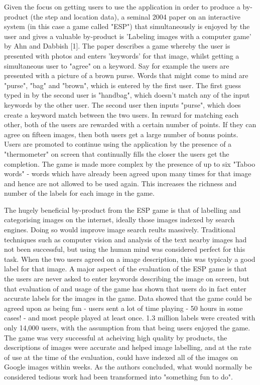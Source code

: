 \documentclass{l4proj}
\begin{document}
Given the focus on getting users to use the application in order to produce a by-product (the step and location data), a seminal 2004 paper on an interactive system (in this case a game called "ESP") that simultaneously is enjoyed by the user and gives a valuable by-product is 'Labeling images with a computer game' by Ahn and Dabbish [1]. The paper describes a game whereby the user is presented with photos and enters 'keywords' for that image, whilst getting a simultaneous user to "agree" on a keyword. Say for example the users are presented with a picture of a brown purse. Words that might come to mind are "purse", "bag" and "brown", which is entered by the first user. The first guess typed in by the second user is "handbag", which doesn't match any of the input keywords by the other user. The second user then inputs "purse", which does create a keyword match between the two users. In reward for matching each other, both of the users are rewarded with a certain number of points. If they can agree on fifteen images, then both users get a large number of bonus points. Users are promoted to continue using the application by the presence of a "thermometer" on screen that continually fills the closer the users get the completion. The game is made more complex by the presence of up to six "Taboo words" - words which have already been agreed upon many times for that image and hence are not allowed to be used again. This increases the richness and number of the labels for each image in the game.

The hugely beneficial by-product from the ESP game is that of labelling and categorising images on the internet, ideally those images indexed by search engines. Doing so would improve image search reults massively. Traditional techniques such as computer vision and analysis of the text nearby images had not been successful, but using the human mind was considered perfect for this task. When the two users agreed on a image description, this was typicaly a good label for that image. A major aspect of the evaluation of the ESP game is that the users are never asked to enter keywords describing the image on screen, but that evaluation of and usage of the game has shown that users do in fact enter accurate labels for the images in the game. Data showed that the game could be agreed upon as being fun - users sent a lot of time playing - 50 hours in some cases! - and most people played at least once. 1.3 million labels were created with only 14,000 users, with the assumption from that being users enjoyed the game. The game was very successful at acheiving high quality by products, the descriptions of images were accurate and helped image labelling, and at the rate of use at the time of the evaluation, could have indexed all of the images on Google images within weeks. As the authors concluded, what would normally be considered tedious work had been transformed into "something fun to do".
\end{document}

